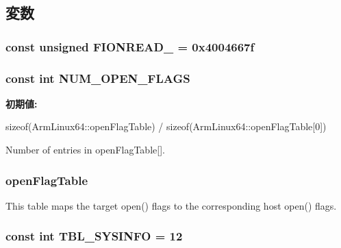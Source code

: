 \subsection{変数}
\hypertarget{classArmLinux64_a79036fcad746cd14c507991b1745526c}{
\subsubsection[{FIONREAD\_\-}]{\setlength{\rightskip}{0pt plus 5cm}const unsigned {\bf FIONREAD\_\-} = 0x4004667f}}
\label{classArmLinux64_a79036fcad746cd14c507991b1745526c}
\hypertarget{classArmLinux64_ad85b9918c8f2c8739537a002dc1dc526}{
\subsubsection[{NUM\_\-OPEN\_\-FLAGS}]{\setlength{\rightskip}{0pt plus 5cm}const int {\bf NUM\_\-OPEN\_\-FLAGS}}}
\label{classArmLinux64_ad85b9918c8f2c8739537a002dc1dc526}
{\bfseries 初期値:}
\begin{DoxyCode}
 sizeof(ArmLinux64::openFlagTable) /
                                       sizeof(ArmLinux64::openFlagTable[0])
\end{DoxyCode}


Number of entries in openFlagTable\mbox{[}\mbox{]}. \hypertarget{classArmLinux64_ab1db5a531609b99b262cc849ea24765a}{
\subsubsection[{openFlagTable}]{ {\bf openFlagTable}}}
\label{classArmLinux64_ab1db5a531609b99b262cc849ea24765a}
This table maps the target open() flags to the corresponding host open() flags. \hypertarget{classArmLinux64_a02a979126f2aa34bcdfdc6ab92207d3b}{
\subsubsection[{TBL\_\-SYSINFO}]{\setlength{\rightskip}{0pt plus 5cm}const int {\bf TBL\_\-SYSINFO} = 12}}
\label{classArmLinux64_a02a979126f2aa34bcdfdc6ab92207d3b}


